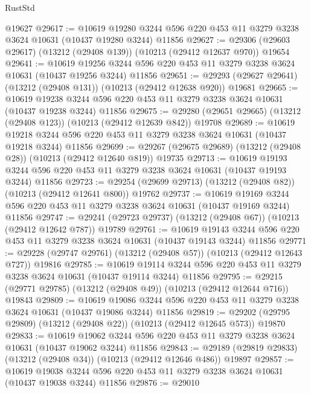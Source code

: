 \begin{lexlean}{RustStd}
\begin{coremodule}
    @19627
@29617 := @10619
    @19280
    @3244
    @596
    @220
    @453
    @11
    @3279
    @3238
    @3624
    @10631
    (@10437 @19280 @3244)
    @11856
@29627 := @29306 (@29603 @29617) (@13212 (@29408 @139)) (@10213 (@29412 @12637 @970)) @19654
@29641 := @10619
    @19256
    @3244
    @596
    @220
    @453
    @11
    @3279
    @3238
    @3624
    @10631
    (@10437 @19256 @3244)
    @11856
@29651 := @29293 (@29627 @29641) (@13212 (@29408 @131)) (@10213 (@29412 @12638 @920)) @19681
@29665 := @10619
    @19238
    @3244
    @596
    @220
    @453
    @11
    @3279
    @3238
    @3624
    @10631
    (@10437 @19238 @3244)
    @11856
@29675 := @29280 (@29651 @29665) (@13212 (@29408 @123)) (@10213 (@29412 @12639 @842)) @19708
@29689 := @10619
    @19218
    @3244
    @596
    @220
    @453
    @11
    @3279
    @3238
    @3624
    @10631
    (@10437 @19218 @3244)
    @11856
@29699 := @29267 (@29675 @29689) (@13212 (@29408 @28)) (@10213 (@29412 @12640 @819)) @19735
@29713 := @10619
    @19193
    @3244
    @596
    @220
    @453
    @11
    @3279
    @3238
    @3624
    @10631
    (@10437 @19193 @3244)
    @11856
@29723 := @29254 (@29699 @29713) (@13212 (@29408 @82)) (@10213 (@29412 @12641 @800)) @19762
@29737 := @10619
    @19169
    @3244
    @596
    @220
    @453
    @11
    @3279
    @3238
    @3624
    @10631
    (@10437 @19169 @3244)
    @11856
@29747 := @29241 (@29723 @29737) (@13212 (@29408 @67)) (@10213 (@29412 @12642 @787)) @19789
@29761 := @10619
    @19143
    @3244
    @596
    @220
    @453
    @11
    @3279
    @3238
    @3624
    @10631
    (@10437 @19143 @3244)
    @11856
@29771 := @29228 (@29747 @29761) (@13212 (@29408 @57)) (@10213 (@29412 @12643 @727)) @19816
@29785 := @10619
    @19114
    @3244
    @596
    @220
    @453
    @11
    @3279
    @3238
    @3624
    @10631
    (@10437 @19114 @3244)
    @11856
@29795 := @29215 (@29771 @29785) (@13212 (@29408 @49)) (@10213 (@29412 @12644 @716)) @19843
@29809 := @10619
    @19086
    @3244
    @596
    @220
    @453
    @11
    @3279
    @3238
    @3624
    @10631
    (@10437 @19086 @3244)
    @11856
@29819 := @29202 (@29795 @29809) (@13212 (@29408 @22)) (@10213 (@29412 @12645 @573)) @19870
@29833 := @10619
    @19062
    @3244
    @596
    @220
    @453
    @11
    @3279
    @3238
    @3624
    @10631
    (@10437 @19062 @3244)
    @11856
@29843 := @29189 (@29819 @29833) (@13212 (@29408 @34)) (@10213 (@29412 @12646 @486)) @19897
@29857 := @10619
    @19038
    @3244
    @596
    @220
    @453
    @11
    @3279
    @3238
    @3624
    @10631
    (@10437 @19038 @3244)
    @11856
@29876 := @29010

\end{coremodule}
\end{lexlean}
